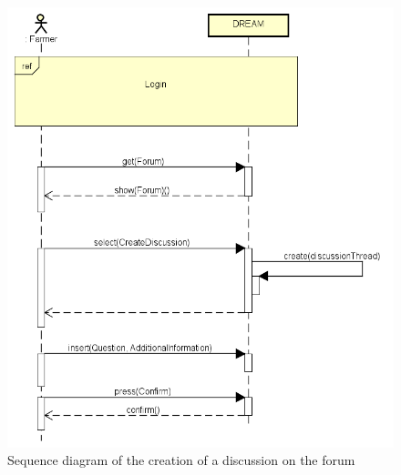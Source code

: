 \bigskip
\begin{figure}[H]
    \centering
    \includegraphics[scale=0.7]{Images/createDiscussion.png}
    \caption{Sequence diagram of the creation of a discussion on the forum}
\end{figure}


